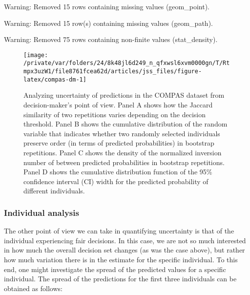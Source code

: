 \documentclass[
  nojss]{jss}
\begin{document}
\begin{CodeChunk}
\begin{CodeOutput}
Warning: Removed 15 rows containing missing values (geom_point).
\end{CodeOutput}
\begin{CodeOutput}
Warning: Removed 15 row(s) containing missing values (geom_path).
\end{CodeOutput}
\begin{CodeOutput}
Warning: Removed 75 rows containing non-finite values (stat_density).
\end{CodeOutput}
\begin{figure}

{\centering \texttt{[image: /private/var/folders/24/8k48jl6d249\_n\_qfxwsl6xvm0000gn/T/Rtmpx3uzW1/file8761fcea62d/articles/jss\_files/figure-latex/compas-dm-1]} 

}

\caption[Analyzing uncertainty of predictions in the COMPAS dataset from decision-maker's point of view]{Analyzing uncertainty of predictions in the COMPAS dataset from decision-maker's point of view. Panel A shows how the Jaccard similarity of two repetitions varies depending on the decision threshold. Panel B shows the cumulative distribution of the random variable that indicates whether two randomly selected individuals preserve order (in terms of predicted probabilities) in bootstrap repetitions. Panel C shows the density of the normalized inversion number of between predicted probabilities in bootstrap repetitions. Panel D shows the cumulative distribution function of the 95\% confidence interval (CI) width for the predicted probability of different individuals.}\label{fig:compas-dm}
\end{figure}
\end{CodeChunk}

\hypertarget{individual-analysis}{%
\subsubsection{Individual analysis}\label{individual-analysis}}

The other point of view we can take in quantifying uncertainty is that
of the individual experiencing fair decisions. In this case, we are not
so much interested in how much the overall decision set changes (as was
the case above), but rather how much variation there is in the estimate
for the specific individual. To this end, one might investigate the
spread of the predicted values for a specific individual. The spread of
the predictions for the first three individuals can be obtained as
follows:
\end{document}
